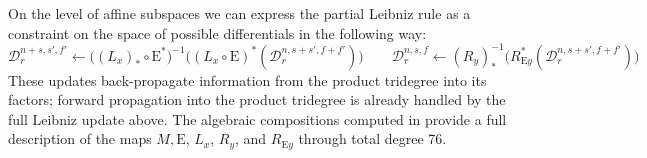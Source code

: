 \documentclass[dvipsnames,table]{amsart}
\theoremstyle{definition}
\theoremstyle{remark}
\numberwithin{equation}{section}
\newcommand{\update}{\mathrel{\gets}}
\begin{document}
\noindent On the level of affine subspaces we can express the partial Leibniz rule as a constraint on the space of possible differentials in the following way:
\begin{equation*}
  \mathcal{D}_r^{n + s,s',f'} \update \bigl((L_x)_* \circ \mathrm{E}^*\bigr)^{-1}\!\bigl((L_x \circ \mathrm{E})^*(\mathcal{D}_r^{n, s + s', f + f'})\bigr)
  \qquad
  \mathcal{D}_r^{n,s,f} \update (R_y)_*^{-1}\!\bigl(R_{\mathrm{E}y}^*(\mathcal{D}_r^{n, s + s', f + f'})\bigr)
\end{equation*}
These updates back-propagate information from the product tridegree into its factors; forward propagation into the product tridegree is already handled by the full Leibniz update above.
The algebraic compositions computed in  provide a full description of the maps $M, \mathrm{E}$, $L_x$, $R_y$, and $R_{\mathrm{E}y}$ through total degree 76.
\end{document}
